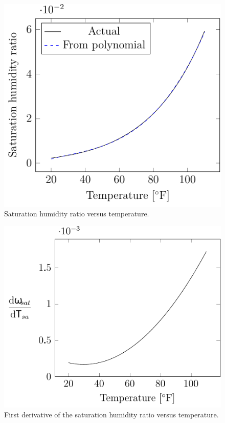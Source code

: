 \begin{figure}
\centering
\includegraphics{Plots/44-SaturatedHumidityVsTemperature/saturationHumidityVsTemperature.pdf}
\caption{Saturation humidity ratio versus temperature.}
\label{fig:saturationHumidityRatioVsTemperature}
\end{figure}


\begin{figure}
\centering
\includegraphics{Plots/45-FirstDerivativeSaturatedHumidityVsTemperature/firstDerivativeSaturatedHumidity.pdf}
\caption{First derivative of the saturation humidity ratio versus temperature.}
\label{fig:firstDeriviativeSaturationHumidityRatioVsTemperature}
\end{figure}

